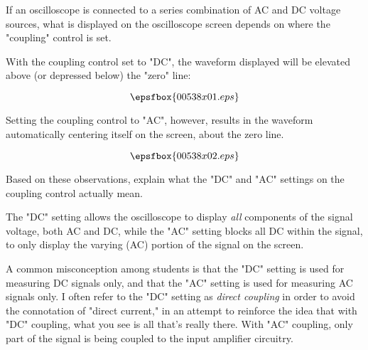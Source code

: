 

If an oscilloscope is connected to a series combination of AC and DC voltage sources, what is displayed on the oscilloscope screen depends on where the "coupling" control is set.

With the coupling control set to "DC", the waveform displayed will be elevated above (or depressed below) the "zero" line:

$$\epsfbox{00538x01.eps}$$

Setting the coupling control to "AC", however, results in the waveform automatically centering itself on the screen, about the zero line.

$$\epsfbox{00538x02.eps}$$

Based on these observations, explain what the "DC" and "AC" settings on the coupling control actually mean.







The "DC" setting allows the oscilloscope to display {\it all} components of the signal voltage, both AC and DC, while the "AC" setting blocks all DC within the signal, to only display the varying (AC) portion of the signal on the screen.







A common misconception among students is that the "DC" setting is used for measuring DC signals only, and that the "AC" setting is used for measuring AC signals only.  I often refer to the "DC" setting as {\it direct coupling} in order to avoid the connotation of "direct current," in an attempt to reinforce the idea that with "DC" coupling, what you see is all that's really there.  With "AC" coupling, only part of the signal is being coupled to the input amplifier circuitry.




